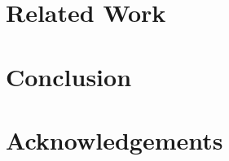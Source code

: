 \documentclass[camera,letterpaper,nomarginnotes,nonarrowgutter]{jpaper}
\begin{document}
\section{Related Work}


\section{Conclusion}


\section*{Acknowledgements}


\balance
\begin{spacing}{0.75}
\begin{footnotesize}


\end{footnotesize}
\end{spacing}
\newpage
\end{document}
